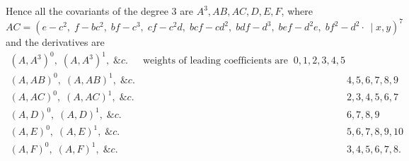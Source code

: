 \documentclass[11pt]{article}
\begin{document}
Hence all the covariants of the degree 3 are $A^3, AB, AC, D, E, F$, where
\[ AC = (e - c^2,\;f - bc^2,\;bf - c^3,\;cf - c^2d,\;bcf - cd^2,\;bdf - d^3,\;bef - d^2e,\;bf^2 - d^2\cdot\, \mid x, y)^7 \]
and the derivatives are
\begin{align*}
(A, A^3)^0,\;(A, A^3)^1,\;\&c.\;\;& \text{weights of leading coefficients are}\;\; 0, 1, 2, 3, 4, 5\\
(A, AB)^0,\;(A, AB)^1,\;\&c. & \;\;\;\;\;\;\;\;\;\;\;\;\;\;\;\;\;\;\;\;\;\;\;\;\;\;\;\;\;\;\;\;\;\;\;\;\;\;\;\;\;\;\;\;\;\;\;\;\;\;\;\;\;\;\;\;\;\;\;\;\;\;\;\;\;\;\;\;\;\;\;\;\;\; 4, 5, 6, 7, 8, 9\\
(A, AC)^0,\;(A, AC)^1,\;\&c. & \;\;\;\;\;\;\;\;\;\;\;\;\;\;\;\;\;\;\;\;\;\;\;\;\;\;\;\;\;\;\;\;\;\;\;\;\;\;\;\;\;\;\;\;\;\;\;\;\;\;\;\;\;\;\;\;\;\;\;\;\;\;\;\;\;\;\;\;\;\;\;\;\;\; 2, 3, 4, 5, 6, 7\\
(A, D)^0,\;(A, D)^1,\;\&c. & \;\;\;\;\;\;\;\;\;\;\;\;\;\;\;\;\;\;\;\;\;\;\;\;\;\;\;\;\;\;\;\;\;\;\;\;\;\;\;\;\;\;\;\;\;\;\;\;\;\;\;\;\;\;\;\;\;\;\;\;\;\;\;\;\;\;\;\;\;\;\;\;\;\; 6, 7, 8, 9\\
(A, E)^0,\;(A, E)^1,\;\&c. & \;\;\;\;\;\;\;\;\;\;\;\;\;\;\;\;\;\;\;\;\;\;\;\;\;\;\;\;\;\;\;\;\;\;\;\;\;\;\;\;\;\;\;\;\;\;\;\;\;\;\;\;\;\;\;\;\;\;\;\;\;\;\;\;\;\;\;\;\;\;\;\;\;\; 5, 6, 7, 8, 9, 10\\
(A, F)^0,\;(A, F)^1,\;\&c. & \;\;\;\;\;\;\;\;\;\;\;\;\;\;\;\;\;\;\;\;\;\;\;\;\;\;\;\;\;\;\;\;\;\;\;\;\;\;\;\;\;\;\;\;\;\;\;\;\;\;\;\;\;\;\;\;\;\;\;\;\;\;\;\;\;\;\;\;\;\;\;\;\;\; 3, 4, 5, 6, 7, 8.
\end{align*}
\end{document}
